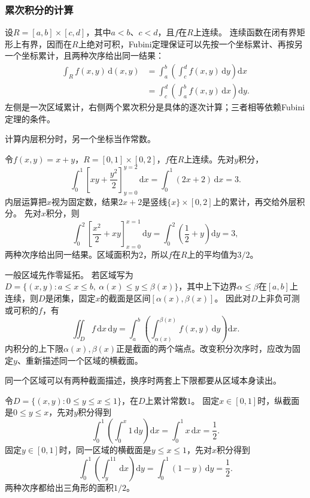 \subsubsection{累次积分的计算}

设$R=[a,b]\times[c,d]$，其中$a<b$、$c<d$，且$f$在$R$上连续。
连续函数在闭有界矩形上有界，因而在$R$上绝对可积，Fubini定理保证可以先按一个坐标累计、再按另一个坐标累计，且两种次序给出同一结果：
\[
 \begin{aligned}
 \int_R f(x,y)\,\mathrm d(x,y)
 &=\int_a^b\left(\int_c^d f(x,y)\,\mathrm dy\right)\mathrm dx\\
 &=\int_c^d\left(\int_a^b f(x,y)\,\mathrm dx\right)\mathrm dy.
 \end{aligned}
\]
左侧是一次区域累计，右侧两个累次积分是具体的逐次计算；三者相等依赖Fubini定理的条件。

计算内层积分时，另一个坐标当作常数。
\begin{example}
\label{ex:region-rectangle-iterated}
令$f(x,y)=x+y$，$R=[0,1]\times[0,2]$，$f$在$R$上连续。先对$y$积分，
\[
 \int_0^1\left[xy+\frac{y^2}{2}\right]_{y=0}^{y=2}\,\mathrm dx
 =\int_0^1(2x+2)\,\mathrm dx=3.
\]
内层运算把$x$视为固定数，结果$2x+2$是竖线$\{x\}\times[0,2]$上的累计，再交给外层积分。
先对$x$积分，则
\[
 \int_0^2\left[\frac{x^2}{2}+xy\right]_{x=0}^{x=1}\,\mathrm dy
 =\int_0^2\left(\frac12+y\right)\mathrm dy=3,
\]
两种次序给出同一结果。区域面积为$2$，所以$f$在$R$上的平均值为$3/2$。
\end{example}

一般区域先作零延拓。
若区域写为$D=\{(x,y):a\leq x\leq b,\ \alpha(x)\leq y\leq\beta(x)\}$，其中上下边界$\alpha\leq\beta$在$[a,b]$上连续，则$D$是闭集，固定$x$的截面是区间$[\alpha(x),\beta(x)]$。
因此对$D$上非负可测或可积的$f$，有
\[
 \iint_Df\,\mathrm dx\,\mathrm dy=\int_a^b\left(\int_{\alpha(x)}^{\beta(x)}f(x,y)\,\mathrm dy\right)\mathrm dx.
\]
内积分的上下限$\alpha(x),\beta(x)$正是截面的两个端点。改变积分次序时，应改为固定$y$、重新描述同一个区域的横截面。

同一个区域可以有两种截面描述，换序时两套上下限都要从区域本身读出。
\begin{example}[三角形区域上交换积分次序]
\label{ex:region-triangle-order-swap}
令$D=\{(x,y):0\leq y\leq x\leq1\}$，在$D$上累计常数$1$。
固定$x\in[0,1]$时，纵截面是$0\leq y\leq x$，先对$y$积分得到
\[
 \int_0^1\left(\int_0^x1\,\mathrm dy\right)\mathrm dx=\int_0^1x\,\mathrm dx=\frac12.
\]
固定$y\in[0,1]$时，同一区域的横截面是$y\leq x\leq1$，先对$x$积分得到
\[
 \int_0^1\left(\int_y^11\,\mathrm dx\right)\mathrm dy=\int_0^1(1-y)\,\mathrm dy=\frac12.
\]
两种次序都给出三角形的面积$1/2$。
\end{example}

